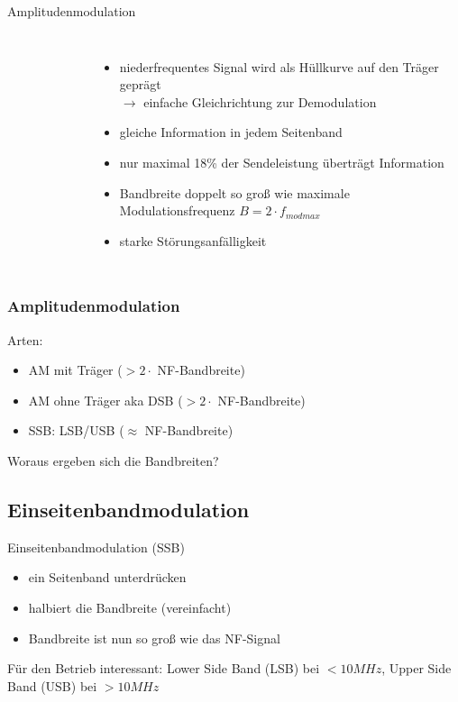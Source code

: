 \begin{frame}{Amplitudenmodulation}
\begin{columns}[c]
\begin{figure}
    \end{figure}
    \begin{itemize}
      \item niederfrequentes Signal wird als Hüllkurve auf den Träger geprägt
        \\ $\rightarrow$ einfache Gleichrichtung zur Demodulation
      \item gleiche Information in jedem Seitenband
      \item nur maximal 18\% der Sendeleistung überträgt Information
      \item Bandbreite doppelt so groß wie maximale Modulationsfrequenz $B = 2 \cdot f_{mod max}$
      \item starke Störungsanfälligkeit
    \end{itemize}
  \end{columns}
\end{frame}

\begin{frame}
  \frametitle{Amplitudenmodulation}

  Arten:

  \begin{itemize}
    \item AM mit Träger ($> 2 \cdot$ NF-Bandbreite)
    \item AM ohne Träger aka DSB ($> 2 \cdot$ NF-Bandbreite)
    \item SSB: LSB/USB ($\approx$ NF-Bandbreite)
  \end{itemize}


  \vspace{2em} Woraus ergeben sich die Bandbreiten?

\end{frame}

\subsection[SSB]{Einseitenbandmodulation}

\begin{frame}{Einseitenbandmodulation (SSB)}

  \begin{itemize}
    \item ein Seitenband unterdrücken
    \item halbiert die Bandbreite (vereinfacht)
    \item Bandbreite ist nun so groß wie das NF-Signal
  \end{itemize}

  \bigskip Für den Betrieb interessant: Lower Side Band (LSB) bei $<10MHz$, Upper Side Band (USB) bei $>10MHz$

\end{frame}

